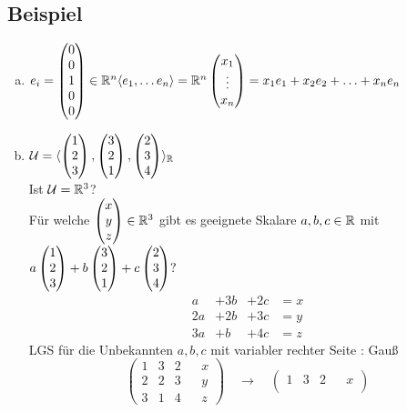\subsection{Beispiel}\label{sec:10.7}
\begin{enumerate}[a)]
\item $e_i = \begin{pmatrix}
0\\0\\1\\0\\0
\end{pmatrix}\in\mathbb{R}^n\\
\langle e_1,\ldots e_n\rangle = \mathbb{R}^n\\
\begin{pmatrix}
x_1\\\vdots\\x_n
\end{pmatrix} = x_1e_1+x_2e_2+\ldots+x_ne_n$
\item $\mathcal{U} = \langle \begin{pmatrix}
1\\2\\3
\end{pmatrix},\begin{pmatrix}
3\\2\\1
\end{pmatrix},\begin{pmatrix}
2\\3\\4
\end{pmatrix}\rangle_{\mathbb{R}}$\\
Ist $\mathcal{U} = \mathbb{R}^3$?\\
Für welche $\begin{pmatrix} x\\y\\z \end{pmatrix} \in \mathbb{R}^3$ gibt es geeignete Skalare $a,b,c\in\mathbb{R}$ mit $a\begin{pmatrix} 1\\2\\3 \end{pmatrix}+b\begin{pmatrix} 3\\2\\1 \end{pmatrix}+c\begin{pmatrix} 2\\3\\4 \end{pmatrix}?\\$
\[ \begin{matrix}
a &+3b&+2c&=x\\
2a&+2b&+3c&=y\\
3a&+b &+4c&=z
\end{matrix} \]
LGS für die Unbekannten $a,b,c$ mit variabler rechter Seite : Gau\ss\\
\[ \begin{pmatrix}
1&3&2&&x\\
2&2&3&&y\\
3&1&4&&z
\end{pmatrix}\quad\to\quad\begin{pmatrix}
1&3&2&&x\\

\end{pmatrix}\]
\end{enumerate}
